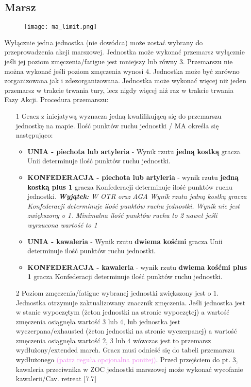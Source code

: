 \subsection{Marsz}
\begin{wrapfigure}{l}{0.1\textwidth}
  \texttt{[image: ma\_limit.png]}
\end{wrapfigure}
Wyłącznie jedna jednostka (nie dowódca) może zostać wybrany do przeprowadzenia akcji marszowej. Jednostka może wykonać przemarsz wyłącznie jeśli jej poziom
zmęczenia/fatigue jest mniejszy lub równy 3. Przemarszu nie można wykonać jeśli poziom zmęczenia wynosi 4. Jednostka może być zarówno zorganizowana jak i zdezorganizowana. Jednostka może wykonać więcej niż jeden przemarsz w trakcie trwania tury, lecz nigdy więcej niż raz w trakcie trwania Fazy Akcji. Procedura przemarszu:
\begin{itemize}
  \item[1] Gracz z inicjatywą wyznacza jedną kwalifikującą się do przemarszu jednostkę na mapie. Ilość punktów ruchu jednostki / MA określa się następująco:
        \begin{itemize}
          \item \textbf{UNIA - piechota lub artyleria} - Wynik rzutu \textbf{jedną kostką} gracza Unii determinuje ilość punktów ruchu jednostki.
          \item \textbf{KONFEDERACJA - piechota lub artyleria} - wynik rzutu \textbf{jedną kostką plus 1} gracza Konfederacji determinuje ilość punktów ruchu jednostki. \textit{\textbf{Wyjątek:} W OTR oraz AGA Wynik rzutu jedną kostką gracza Konfederacji determinuje ilość punktów ruchu jednostki. Wynik nie jest zwiększony o 1. Minimalna ilość punktów ruchu to 2 nawet jeśli wyrzucona wartość to 1}
          \item \textbf{UNIA - kawaleria} - Wynik rzutu \textbf{dwiema kośćmi} gracza Unii determinuje ilość punktów ruchu jednostki.
          \item \textbf{KONFEDERACJA - kawaleria} - wynik rzutu \textbf{dwiema kośćmi plus 1} gracza Konfederacji determinuje ilość punktów ruchu jednostki.
        \end{itemize}
  \item[2] Poziom zmęczenia/fatigue wybranej jednostki zwiększony jest o 1. Jednostka otrzymuje zaktualizowany znacznik zmęczenia.
        Jeśli jednostka jest w stanie wypoczętym (żeton jednostki na stronie wypoczętej) a wartość zmęczenia osiągnęła wartość 3 lub 4, lub jednostka jest wyczerpana/exhausted (żeton jednostki na stronie wyczerpanej) a wartość zmęczenia osiągnęła wartość 2, 3 lub 4 wówczas jest to przemarsz wydłużony/extended march. Gracz musi odnieść się do tabeli przemarszu wydłużonego \textcolor{violet}{(patrz reguła opcjonalna poniżej)}. Przed przejściem do pt. 3, kawaleria przeciwnika w ZOC jednostki marszowej może wykonać wycofanie kawalerii/Cav. retreat [7.7]

\end{itemize}
